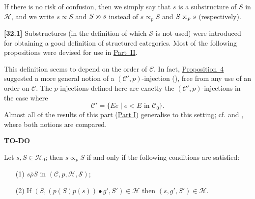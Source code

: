 \documentclass[a4paper,fleqn]{article}
\theoremstyle{plain}
\newenvironment{proposition}[1]
  {\renewcommand\theinnerproposition{#1}\innerproposition}
  {\endinnerproposition}
\theoremstyle{definition}
\newenvironment{longcomm}[1]
  {\noindent\textbf{[#1]}\rmfamily}
  {}
\newcommand{\todo}{{\color{purple}\textbf{TO-DO }}}
\newcommand{\CC}{\mathcal{C}}
\newcommand{\HH}{\mathcal{H}}
\renewcommand{\SS}{\mathcal{S}}
\newcommand{\relrhobar}{\mathrel{\overline{\rho}}}
\newcommand{\subs}{\mathrel{\propto}}
\newcommand{\sups}{\mathrel{\reflectbox{$\propto$}}}
\begin{document}
If there is no risk of confusion, then we simply say that $s$ is a substructure of $S$ in $\HH$, and we write $s\subs S$ and $S\sups s$ instead of $s\subs_p S$ and $S\sups_p s$ (respectively).

\begin{longcomm}{32.1}
  Substructures (in the definition of which $\SS$ is not used) were introduced for obtaining a good definition of structured categories.
  Most of the following propositions were devised for use in \hyperref[section:ii]{Part~II}.

  This definition seems to depend on the order of $\CC$.
  In fact, \hyperref[proposition:i-4]{Proposition~4} suggested a more general notion of a $(\CC',p)$-injection (\cite{coll69,coll66}), free from any use of an order on $\CC$.
  The $p$-injections defined here are exactly the $(\CC',p)$-injections in the case where
  \[
    \CC'
    = \{Ee \mid e<E\text{ in }\CC_0\}.
  \]
  Almost all of the results of this part (\hyperref[section:i]{Part I}) generalise to this setting; cf. \cite{coll66} and \cite{coll69}, where both notions are compared.

  \todo
\end{longcomm}

\begin{proposition}{4}
\label{proposition:i-4}
  Let $s,S\in\HH_0$;
  then $s\subs_p S$ if and only if the following conditions are satisfied:
  \begin{enumerate}
    \item[\normalfont(1\textquotesingle)]
      $s\relrhobar S$ in $(\CC,p,\HH,\SS)$;
    \item[\normalfont(2\textquotesingle)]
      If $(S,(p(S)p(s))\bullet g',S')\in\HH$ then $(s,g',S')\in\HH$.
  \end{enumerate}
\end{proposition}
\end{document}
